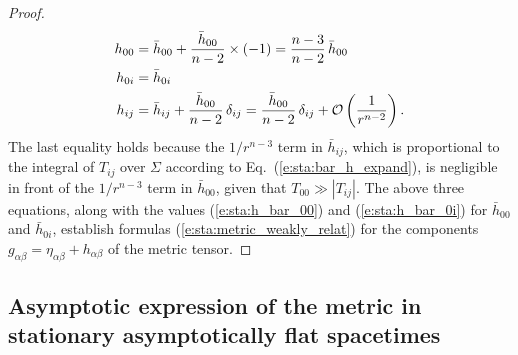 \begin{proof}
\begin{align}
  h_{00} & = \bar{h}_{00} + \frac{\bar{h}_{00}}{n-2} \times (-1) = \frac{n-3}{n-2}\,  \bar{h}_{00} \nonumber \\
  h_{0i} & = \bar{h}_{0i} \nonumber \\
  h_{ij} & = \bar{h}_{ij} + \frac{\bar{h}_{00}}{n-2} \, \delta_{ij} =
    \frac{\bar{h}_{00}}{n-2} \, \delta_{ij} + \mathcal{O}\left( \frac{1}{r^{n-2}} \right)
  \nonumber .
\end{align}
The last equality holds because the $1/r^{n-3}$ term in $\bar{h}_{ij}$, which is proportional
to the integral of $T_{ij}$ over $\Sigma$ according to Eq.~(\ref{e:sta:bar_h_expand}),
is negligible in front of the $1/r^{n-3}$ term in $\bar{h}_{00}$, given
that $T_{00} \gg |T_{ij}|$. The above three equations, along with the values
(\ref{e:sta:h_bar_00}) and (\ref{e:sta:h_bar_0i}) for $\bar{h}_{00}$
and $\bar{h}_{0i}$, establish formulas (\ref{e:sta:metric_weakly_relat}) for
the components $g_{\alpha\beta} = \eta_{\alpha\beta} + h_{\alpha\beta}$
of the metric tensor.
\end{proof}

\subsection{Asymptotic expression of the metric in stationary asymptotically flat spacetimes}
\label{s:sta:asymptotic_metric}

